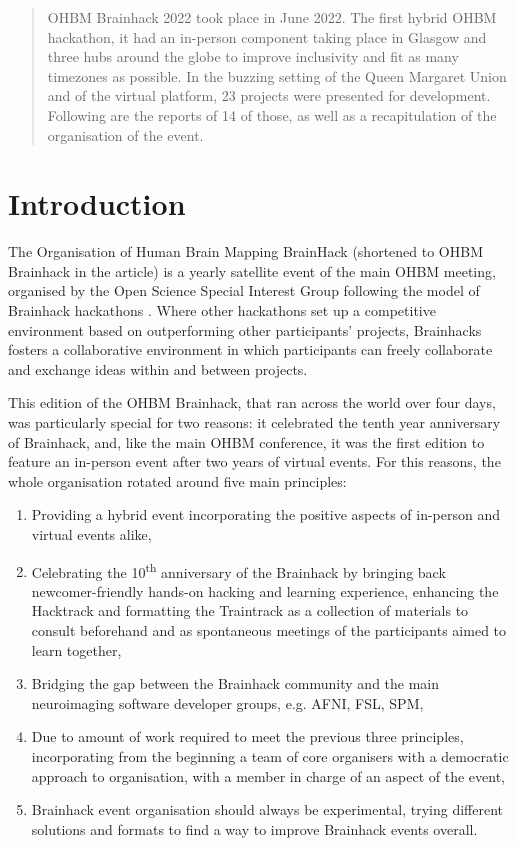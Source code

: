 \documentclass[10pt,a4paper,twocolumns]{proc}
\begin{document}
\begin{abstract}
OHBM Brainhack 2022 took place in June 2022. The first hybrid OHBM hackathon, it had an in-person component taking place in Glasgow and three hubs around the globe to improve inclusivity and fit as many timezones as possible.
In the buzzing setting of the Queen Margaret Union and of the virtual platform, 23 projects were presented for development.
Following are the reports of 14 of those, as well as a recapitulation of the organisation of the event. 
\end{abstract}

\section*{Introduction}

The Organisation of Human Brain Mapping BrainHack (shortened to OHBM
Brainhack in the article) is a yearly satellite event of the main OHBM
meeting, organised by the Open Science Special Interest Group following
the model of Brainhack hackathons \parencite{Gau2021}.
Where other hackathons set up a competitive environment based on
outperforming other participants' projects, Brainhacks fosters a
collaborative environment in which participants can freely collaborate
and exchange ideas within and between projects.

This edition of the OHBM Brainhack, that ran across the world over four
days, was particularly special for two reasons: it celebrated the tenth
year anniversary of Brainhack, and, like the main OHBM conference, it
was the first edition to feature an in-person event after two years of
virtual events. For this reasons, the whole organisation rotated around
five main principles:

\begin{enumerate}
\tightlist
\item
  Providing a hybrid event incorporating the positive aspects of
  in-person and virtual events alike,
\item
  Celebrating the 10\textsuperscript{th} anniversary of the
  Brainhack by bringing back newcomer-friendly hands-on hacking and
  learning experience, enhancing the Hacktrack and formatting the
  Traintrack as a collection of materials to consult beforehand and as
  spontaneous meetings of the participants aimed to learn together,
\item
  Bridging the gap between the Brainhack community and the main
  neuroimaging software developer groups, e.g. AFNI, FSL, SPM,
\item
  Due to amount of work required to meet the previous three principles,
  incorporating from the beginning a team of core organisers with a
  democratic approach to organisation, with a member in charge of an
  aspect of the event,
\item
  Brainhack event organisation should always be experimental, trying
  different solutions and formats to find a way to improve Brainhack
  events overall. 
\end{enumerate}
\end{document}
